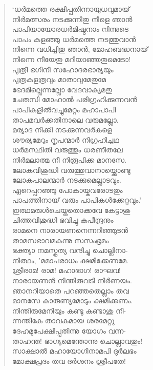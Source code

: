 \begin{verse}
‘ധര്‍മത്തെ രക്ഷിപ്പതിന്നായുധവുമായ്\\
നിര്‍മത്സരം നടക്കുന്നിതു നീളെ ഞാന്‍\\
പാപിയായോരധര്‍മിഷ്ഠനാം നിന്നുടെ\\
പാപം കളഞ്ഞു ധര്‍മത്തെ നടത്തുവാന്‍\\
നിന്നെ വധിച്ചിതു ഞാന്‍, മോഹബദ്ധനായ്\\
നിന്നെ നീയേതു മറിയാഞ്ഞതുമെടോ!\\
പുത്രീ ഭഗിനീ സഹോദരഭാര്യയും\\
പുത്രകളത്രവും മാതാവുമേതുമേ\\
ഭേദമില്ലെന്നല്ലോ വേദവാക്യമതു\\
ചേതസി മോഹാല്‍ പരിഗ്രഹിക്കുന്നവന്‍\\
പാപികളില്‍വച്ചുമേറ്റം മഹാപാപി\\
താപമവര്‍ക്കതിനാലെ വരുമല്ലോ.\\
മര്യാദ നീക്കി നടക്കുന്നവര്‍കളെ\\
ശൗര്യമേറും നൃപന്മാര്‍ നിഗ്രഹിച്ചഥ\\
ധര്‍മസ്ഥിതി വരുത്തും ധരണീതലേ\\
നിര്‍മലാത്മ നീ നിരൂപിക്ക മാനസേ.\\
ലോകവിശുദ്ധി വരുത്തുവാനായ്ക്കൊണ്ടു\\
ലോകപാലന്മാര്‍ നടക്കുമെല്ലാടവും.\\
ഏറെപ്പറഞ്ഞു പോകായ്കവരോടതും\\
പാപത്തിനായ് വരും പാപികള്‍ക്കേറ്റവും.’\\
ഇത്ഥമരുള്‍ചെയ്തതൊക്കവേ കേട്ടാശു\\
ചിത്തവിശുദ്ധി ഭവിച്ചു കപീന്ദ്രനും\\
രാമനെ നാരായണനെന്നറിഞ്ഞുടന്‍\\
താമസഭാവമകന്നു സസംഭ്രമം\\
ഭക്ത്യാ നമസ്കൃത്യ വന്ദിച്ചു ചൊല്ലിനാ-\\
നിത്ഥം, ’മമാപരാധം ക്ഷമിക്കേണമേ.\\
ശ്രീരാമ! രാമ! മഹാഭാഗ! രാഘവ!\\
നാരായണന്‍ നിന്തിരുവടി നിര്‍ണയം.\\
ഞാനറിയാതെ പറഞ്ഞതെല്ലാം തവ\\
മാനസേ കാരുണ്യമോടും ക്ഷമിക്കണം.\\
നിന്തിരുമേനിയും കണ്ടു കണ്ടാശു നി-\\
ന്നന്തികേ താവകമായ ശരമേറ്റു\\
ദേഹമുപേക്ഷിപ്പതിന്നു യോഗം വന്ന-\\
താഹന്ത! ഭാഗ്യമെന്തോന്നു ചൊല്ലാവതും!\\
സാക്ഷാല്‍ മഹായോഗിനാമപി ദുര്‍ലഭം\\
മോക്ഷപ്രദം തവ ദര്‍ശനം ശ്രീപതേ!\\

\end{verse}
